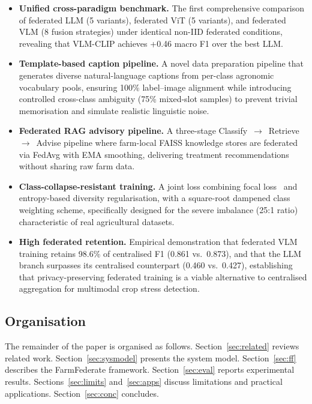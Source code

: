 \documentclass[conference]{IEEEtran}
\begin{document}
\begin{itemize}
  \item \textbf{Unified cross-paradigm benchmark.} The first comprehensive comparison
        of federated LLM (5 variants), federated ViT (5 variants), and federated VLM
        (8 fusion strategies) under identical non-IID federated conditions, revealing
        that VLM-CLIP achieves +0.46 macro F1 over the best LLM.
  \item \textbf{Template-based caption pipeline.} A novel data preparation pipeline
        that generates diverse natural-language captions from per-class agronomic
        vocabulary pools, ensuring 100\% label--image alignment while introducing
        controlled cross-class ambiguity (75\% mixed-slot samples) to prevent trivial
        memorisation and simulate realistic linguistic noise.
  \item \textbf{Federated RAG advisory pipeline.} A three-stage Classify~$\to$~Retrieve~$\to$~Advise
        pipeline where farm-local FAISS knowledge stores are federated via FedAvg with
        EMA smoothing, delivering treatment recommendations without sharing raw farm data.
  \item \textbf{Class-collapse-resistant training.} A joint loss combining focal
        loss~\cite{Lin2017} and entropy-based diversity regularisation, with a
        square-root dampened class weighting scheme, specifically designed for the
        severe imbalance (25:1 ratio) characteristic of real agricultural datasets.
  \item \textbf{High federated retention.} Empirical demonstration that federated
        VLM training retains 98.6\% of centralised F1 (0.861 vs.\ 0.873), and that the
        LLM branch surpasses its centralised counterpart (0.460 vs.\ 0.427), establishing
        that privacy-preserving federated training is a viable alternative to
        centralised aggregation for multimodal crop stress detection.
\end{itemize}

\subsection{Organisation}

The remainder of the paper is organised as follows. Section~\ref{sec:related} reviews
related work. Section~\ref{sec:sysmodel} presents the system model. Section~\ref{sec:ff}
describes the FarmFederate framework. Section~\ref{sec:eval} reports experimental
results. Sections~\ref{sec:limits} and~\ref{sec:apps} discuss limitations and practical
applications. Section~\ref{sec:conc} concludes.
\end{document}
